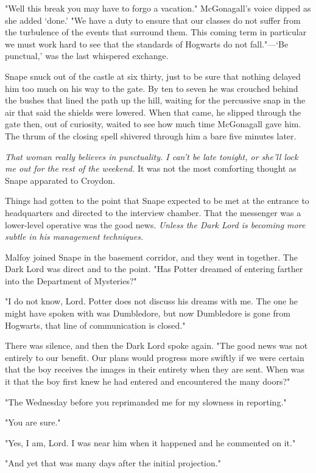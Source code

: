 "Well this break you may have to forgo a vacation." McGonagall's voice dipped as she added `done.' "We have a duty to ensure that our classes do not suffer from the turbulence of the events that surround them. This coming term in particular we must work hard to see that the standards of Hogwarts do not fall."—`Be punctual,' was the last whispered exchange.

Snape snuck out of the castle at six thirty, just to be sure that nothing delayed him too much on his way to the gate. By ten to seven he was crouched behind the bushes that lined the path up the hill, waiting for the percussive snap in the air that said the shields were lowered. When that came, he slipped through the gate then, out of curiosity, waited to see how much time McGonagall gave him. The thrum of the closing spell shivered through him a bare five minutes later.

\emph{That woman really believes in punctuality. I can't be late tonight, or she'll lock me out for the rest of the weekend.} It was not the most comforting thought as Snape apparated to Croydon.

Things had gotten to the point that Snape expected to be met at the entrance to headquarters and directed to the interview chamber. That the messenger was a lower-level operative was the good news. \emph{Unless the Dark Lord is becoming more subtle in his management techniques.}

Malfoy joined Snape in the basement corridor, and they went in together. The Dark Lord was direct and to the point. "Has Potter dreamed of entering farther into the Department of Mysteries?"

"I do not know, Lord. Potter does not discuss his dreams with me. The one he might have spoken with was Dumbledore, but now Dumbledore is gone from Hogwarts, that line of communication is closed."

There was silence, and then the Dark Lord spoke again. "The good news was not entirely to our benefit. Our plans would progress more swiftly if we were certain that the boy receives the images in their entirety when they are sent. When was it that the boy first knew he had entered and encountered the many doors?"

"The Wednesday before you reprimanded me for my slowness in reporting."

"You are sure."

"Yes, I am, Lord. I was near him when it happened and{\el} he commented on it."

"And yet that was many days after the initial projection."

